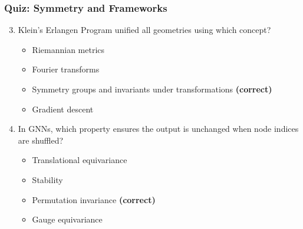\begin{frame}[fragile]\frametitle{Quiz: Symmetry and Frameworks}
  \begin{enumerate}
    \setcounter{enumi}{2}
    \item Klein's Erlangen Program unified all geometries using which concept?
      \begin{itemize}
        \item[a)] Riemannian metrics
        \item[b)] Fourier transforms
        \item[c)] Symmetry groups and invariants under transformations \textbf{(correct)}
        \item[d)] Gradient descent
      \end{itemize}
    \vspace{0.4cm}
    \item In GNNs, which property ensures the output is unchanged when node indices are shuffled?
      \begin{itemize}
        \item[a)] Translational equivariance
        \item[b)] Stability
        \item[c)] Permutation invariance \textbf{(correct)}
        \item[d)] Gauge equivariance
      \end{itemize}
  \end{enumerate}
\end{frame}
